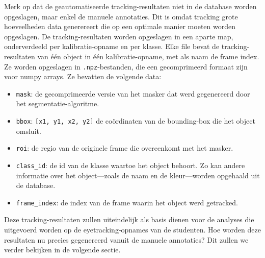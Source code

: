 Merk op dat de geautomatiseerde tracking-resultaten niet in de database worden opgeslagen, maar enkel de manuele annotaties.
Dit is omdat tracking grote hoeveelheden data generereert die op een optimale manier moeten worden opgeslagen.
De tracking-resultaten worden opgeslagen in een aparte map, onderverdeeld per kalibratie-opname en per klasse.
Elke file bevat de tracking-resultaten van één object in één kalibratie-opname, met als naam de frame index.
Ze worden opgeslagen in \texttt{.npz}-bestanden, die een gecomprimeerd formaat zijn voor numpy arrays.
Ze bevatten de volgende data:
\begin{itemize}
  \item \texttt{mask}: de gecomprimeerde versie van het masker dat werd gegenereerd door het segmentatie-algoritme.
  \item \texttt{bbox}: \texttt{[x1, y1, x2, y2]} de coördinaten van de bounding-box die het object omsluit.
  \item \texttt{roi}: de regio van de originele frame die overeenkomt met het masker.
  \item \texttt{class\_id}: de id van de klasse waartoe het object behoort. 
  Zo kan andere informatie over het object---zoals de naam en de kleur---worden opgehaald uit de database.
  \item \texttt{frame\_index}: de index van de frame waarin het object werd getracked.
\end{itemize}

Deze tracking-resultaten zullen uiteindelijk als basis dienen voor de analyses die uitgevoerd worden op de eyetracking-opnames van de studenten.
Hoe worden deze resultaten nu precies gegenereerd vanuit de manuele annotaties? Dit zullen we verder bekijken in de volgende sectie.

